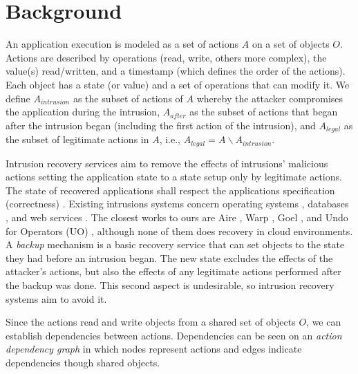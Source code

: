 
\section{Background}\label{sec:background}
An application execution is modeled as a set of actions $A$ on a set of objects $O$. Actions are described by operations (read, write, others more complex), the value(s) read/written, and a timestamp (which defines the order of the actions). Each object has a state (or value) and a set of operations that can modify it. We define $A_{intrusion}$ as the subset of actions of $A$ whereby the attacker compromises the application during the intrusion, $A_{after}$ as the subset of actions that began after the intrusion began (including the first action of the intrusion), and $A_{legal}$ as the subset of legitimate actions in $A$, i.e., $A_{legal} = A \backslash A_{intrusion}$.


Intrusion recovery services aim to remove the effects of intrusions' malicious actions setting the application state to a state setup only by legitimate actions. The state of recovered applications shall respect the applications specification (correctness) \cite{Aviz}. Existing intrusions systems concern operating systems \cite{taser,retro,dare}, databases \cite{itdb,phoenix}, and web services \cite{warp,Akkus2010,aire}. The closest works to ours are Aire \cite{aire}, Warp \cite{warp}, Goel \cite{Akkus2010}, and Undo for Operators (UO) \cite{undoForOperators}, although none of them does recovery in cloud environments.\\

A \textit{backup} mechanism is a basic recovery service that can set objects to the state they had before an intrusion began. The new state excludes the effects of the attacker's actions, but also the effects of any legitimate actions performed after the backup was done. This second aspect is undesirable, so intrusion recovery systems aim to avoid it.

Since the actions read and write objects from a shared set of objects $O$, we can establish dependencies between actions. Dependencies can be seen on an \textit{action dependency graph} in which nodes represent actions and edges indicate dependencies though shared objects.

